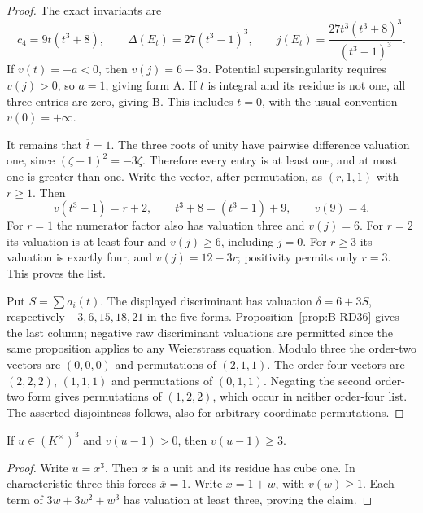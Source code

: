 \begin{proof}
The exact invariants are
\[
 c_4=9t(t^3+8),\qquad \Delta(E_t)=27(t^3-1)^3,\qquad
 j(E_t)=\frac{27t^3(t^3+8)^3}{(t^3-1)^3}.
                                                        \tag{B-RD37.3}
\]
If $v(t)=-a<0$, then $v(j)=6-3a$. Potential supersingularity
requires $v(j)>0$, so $a=1$, giving form A. If $t$ is integral
and its residue is not one, all three entries are zero, giving B.
This includes $t=0$, with the usual convention $v(0)=+\infty$.

It remains that $\overline t=1$. The three roots of unity have
pairwise difference valuation one, since
$(\zeta-1)^2=-3\zeta$. Therefore every entry is at least one,
and at most one is greater than one. Write the vector, after
permutation, as $(r,1,1)$ with $r\ge1$. Then
\[
 v(t^3-1)=r+2,
 \qquad t^3+8=(t^3-1)+9,
 \qquad v(9)=4.
\]
For $r=1$ the numerator factor also has valuation three and
$v(j)=6$. For $r=2$ its valuation is at least four and
$v(j)\ge6$, including $j=0$. For $r\ge3$ its valuation is
exactly four, and $v(j)=12-3r$; positivity permits only $r=3$.
This proves the list.

Put $S=\sum a_i(t)$. The displayed discriminant has valuation
$\delta=6+3S$, respectively $-3,6,15,18,21$ in the five forms.
Proposition~\ref{prop:B-RD36} gives the last column; negative raw
discriminant valuations are permitted since the same proposition
applies to any Weierstrass equation. Modulo three the order-two
vectors are $(0,0,0)$ and permutations of $(2,1,1)$. The
order-four vectors are $(2,2,2)$, $(1,1,1)$ and permutations of
$(0,1,1)$. Negating the second order-two form gives permutations
of $(1,2,2)$, which occur in neither order-four list. The asserted
disjointness follows, also for arbitrary coordinate permutations.
\end{proof}

\begin{lemma}
\label{lem:B-RD37-units}
If $u\in(K^\times)^3$ and $v(u-1)>0$, then $v(u-1)\ge3$.
\end{lemma}
\begin{proof}
Write $u=x^3$. Then $x$ is a unit and its residue has cube one.
In characteristic three this forces $\overline x=1$. Write
$x=1+w$, with $v(w)\ge1$. Each term of
$3w+3w^2+w^3$ has valuation at least three, proving the claim.
\end{proof}

